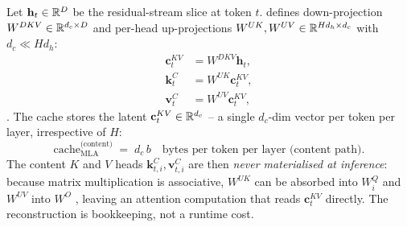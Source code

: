 Let $\mathbf{h}_t \in \mathbb{R}^{D}$ be the residual-stream slice at token
$t$.  defines down-projection $W^{DKV} \in \mathbb{R}^{d_c \times D}$ and
per-head up-projections
$W^{UK}, W^{UV} \in \mathbb{R}^{H d_h \times d_c}$ with $d_c \ll H d_h$:
\begin{align}
  \mathbf{c}_t^{KV} &= W^{DKV} \mathbf{h}_t,
   \tag{DSV2--Eq.~9} \label{eq:mla-cdkv} \\
  \mathbf{k}_t^C    &= W^{UK} \mathbf{c}_t^{KV},
   \tag{DSV2--Eq.~10} \label{eq:mla-kc} \\
  \mathbf{v}_t^C    &= W^{UV} \mathbf{c}_t^{KV},
   \tag{DSV2--Eq.~11} \label{eq:mla-vc}
\end{align}
\citep[\S 2.1.2, Eq.~9--11]{deepseek-v2}. The cache stores the latent
$\mathbf{c}_t^{KV} \in \mathbb{R}^{d_c}$ -- a single $d_c$-dim vector per token
per layer, irrespective of $H$:
\begin{equation}
  \mathrm{cache}_{\mathrm{MLA}}^{\text{(content)}}
  \;=\; d_c\,b
  \quad\text{bytes per token per layer (content path)}.
  \label{eq:mla-cache-content}
\end{equation}
The content $K$ and $V$ heads $\mathbf{k}_{t,i}^C, \mathbf{v}_{t,i}^C$
are then \emph{never materialised at inference}: because matrix
multiplication is associative, $W^{UK}$ can be absorbed into $W_i^Q$
and $W^{UV}$ into $W^O$ \citep[\S 2.1.2]{deepseek-v2}, leaving an
attention computation that reads $\mathbf{c}_t^{KV}$ directly. The
reconstruction is bookkeeping, not a runtime cost.

